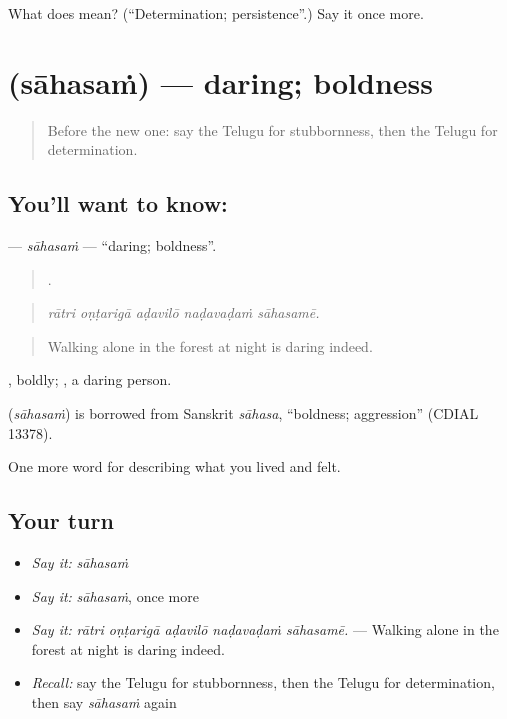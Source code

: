 \begin{tcolorbox}[breakable,colback=teal!4,colframe=teal!35!black,title={Before you move on}]
What does  mean? (\textquotedblleft{}Determination; persistence\textquotedblright{}.) Say it once more.
\end{tcolorbox}
\section[\texorpdfstring{\te{సాహసం} (sāhasaṁ)}{సాహసం (sāhasaṁ)}]{ (sāhasaṁ) — daring; boldness}

\label{lesson:TE-C508-sahasam}



\begin{quote}
Before the new one: say the Telugu for stubbornness, then the Telugu for determination.
\end{quote}

\subsection*{You'll want to know: }
\textbf{} — \emph{sāhasaṁ} — \textquotedblleft{}daring; boldness\textquotedblright{}.

\begin{quote}
    .
\end{quote}

\begin{quote}
\emph{rātri oṇṭarigā aḍavilō naḍavaḍaṁ sāhasamē.}
\end{quote}

\begin{quote}
Walking alone in the forest at night is daring indeed.
\end{quote}

, boldly; , a daring person.

\begin{cousinweb}
\textbf{} (\emph{sāhasaṁ}) is borrowed from Sanskrit \emph{sāhasa}, \textquotedblleft{}boldness; aggression\textquotedblright{} (CDIAL 13378).
\end{cousinweb}

\begin{grammarlens}[title={What you've built}]
One more word for describing what you lived and felt.
\end{grammarlens}

\subsection*{Your turn}
\begin{itemize}
\raggedright
  \item \emph{Say it:} \emph{sāhasaṁ}
  \item \emph{Say it:} \emph{sāhasaṁ}, once more
  \item \emph{Say it:} \emph{rātri oṇṭarigā aḍavilō naḍavaḍaṁ sāhasamē.} — Walking alone in the forest at night is daring indeed.
  \item \emph{Recall:} say the Telugu for stubbornness, then the Telugu for determination, then say \emph{sāhasaṁ} again
\end{itemize}


